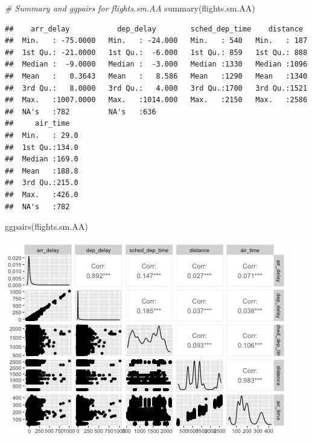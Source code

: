 \documentclass[
]{article}
\newenvironment{Shaded}{\begin{snugshade}}{\end{snugshade}}
\newcommand{\CommentTok}[1]{\textcolor[rgb]{0.56,0.35,0.01}{\textit{#1}}}
\newcommand{\FunctionTok}[1]{\textcolor[rgb]{0.00,0.00,0.00}{#1}}
\newcommand{\NormalTok}[1]{#1}
\begin{document}
\begin{Shaded}
\begin{Highlighting}[]
\CommentTok{\# Summary and ggpairs for flights.sm.AA}
\FunctionTok{summary}\NormalTok{(flights.sm.AA)}
\end{Highlighting}
\end{Shaded}

\begin{verbatim}
##    arr_delay           dep_delay        sched_dep_time    distance   
##  Min.   : -75.0000   Min.   : -24.000   Min.   : 540   Min.   : 187  
##  1st Qu.: -21.0000   1st Qu.:  -6.000   1st Qu.: 859   1st Qu.: 888  
##  Median :  -9.0000   Median :  -3.000   Median :1330   Median :1096  
##  Mean   :   0.3643   Mean   :   8.586   Mean   :1290   Mean   :1340  
##  3rd Qu.:   8.0000   3rd Qu.:   4.000   3rd Qu.:1700   3rd Qu.:1521  
##  Max.   :1007.0000   Max.   :1014.000   Max.   :2150   Max.   :2586  
##  NA's   :782         NA's   :636                                     
##     air_time    
##  Min.   : 29.0  
##  1st Qu.:134.0  
##  Median :169.0  
##  Mean   :188.8  
##  3rd Qu.:215.0  
##  Max.   :426.0  
##  NA's   :782
\end{verbatim}

\begin{Shaded}
\begin{Highlighting}[]
\FunctionTok{ggpairs}\NormalTok{(flights.sm.AA)}
\end{Highlighting}
\end{Shaded}

\includegraphics{HW3-Trinath-Sai-Subhash-Reddy-Pittala_files/figure-latex/unnamed-chunk-3-1.png}
\end{document}
